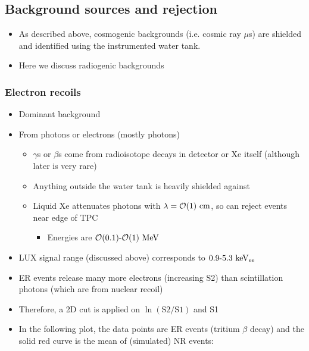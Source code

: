 \subsection{Background sources and rejection}
\begin{itemize}
  \item As described above, cosmogenic backgrounds (i.e. cosmic ray $\mu$s) are shielded and identified using the instrumented water tank.
  \item Here we discuss radiogenic backgrounds
\end{itemize}
\subsubsection{Electron recoils}
\begin{itemize}
  \item Dominant background
  \item From photons or electrons (mostly photons)
  \begin{itemize}
    \item $\gamma$s or $\beta$s come from radioisotope decays in detector or Xe itself (although later is very rare)
    \item Anything outside the water tank is heavily shielded against
    \item Liquid Xe attenuates photons with $\lambda = \mathcal{O}(1)~\text{cm}$, so can reject events near edge of TPC
    \begin{itemize}
      \item Energies are $\ord{0.1}\textto\ord{1}~\mev$
    \end{itemize}
  \end{itemize}
  \item LUX signal range (discussed above) corresponds to $0.9\textto5.3~\kev_\text{ee}$
  \item ER events release many more electrons (increasing S2) than scintillation photons (which are from nuclear recoil)
  \item Therefore, a 2D cut is applied on $\ln (\text{S2}/\text{S1})$ and S1
  \item In the following plot, the data points are ER events (tritium $\beta$ decay) and the solid red curve is the mean of (simulated) NR events:
\end{itemize}

